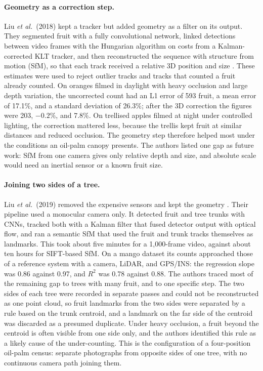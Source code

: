 \paragraph{Geometry as a correction step.} Liu \textit{et al.}\ (2018) kept a tracker but added geometry as a filter on its output. They segmented fruit with a fully convolutional network, linked detections between video frames with the Hungarian algorithm on costs from a Kalman-corrected KLT tracker, and then reconstructed the sequence with structure from motion (SfM), so that each track received a relative 3D position and size \cite{ledger_m_9966d81433d61ed3}. These estimates were used to reject outlier tracks and tracks that counted a fruit already counted. On oranges filmed in daylight with heavy occlusion and large depth variation, the uncorrected count had an L1 error of 593 fruit, a mean error of 17.1\%, and a standard deviation of 26.3\%; after the 3D correction the figures were 203, $-0.2\%$, and 7.8\%. On trellised apples filmed at night under controlled lighting, the correction mattered less, because the trellis kept fruit at similar distances and reduced occlusion. The geometry step therefore helped most under the conditions an oil-palm canopy presents. The authors listed one gap as future work: SfM from one camera gives only relative depth and size, and absolute scale would need an inertial sensor or a known fruit size.

\paragraph{Joining two sides of a tree.} Liu \textit{et al.}\ (2019) removed the expensive sensors and kept the geometry \cite{ledger_r_00f82e0f404d691b}. Their pipeline used a monocular camera only. It detected fruit and tree trunks with CNNs, tracked both with a Kalman filter that fused detector output with optical flow, and ran a semantic SfM that used the fruit and trunk tracks themselves as landmarks. This took about five minutes for a 1{,}000-frame video, against about ten hours for SIFT-based SfM. On a mango dataset its counts approached those of a reference system with a camera, LiDAR, and GPS/INS: the regression slope was 0.86 against 0.97, and $R^2$ was 0.78 against 0.88. The authors traced most of the remaining gap to trees with many fruit, and to one specific step. The two sides of each tree were recorded in separate passes and could not be reconstructed as one point cloud, so fruit landmarks from the two sides were separated by a rule based on the trunk centroid, and a landmark on the far side of the centroid was discarded as a presumed duplicate. Under heavy occlusion, a fruit beyond the centroid is often visible from one side only, and the authors identified this rule as a likely cause of the under-counting. This is the configuration of a four-position oil-palm census: separate photographs from opposite sides of one tree, with no continuous camera path joining them.

